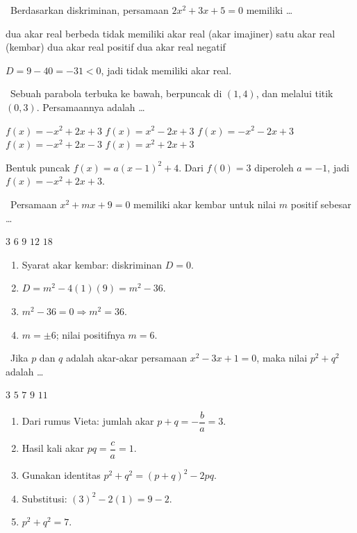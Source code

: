 \documentclass[11pt,a4paper]{exam}
\newenvironment{langkah}{%
  \begin{enumerate}[label=\textbf{Langkah \arabic*:},leftmargin=2.6em,
    itemsep=2pt,topsep=2pt]}{\end{enumerate}}
\newcommand{\Inter}{{\footnotesize\textsf{\textcolor{biru}{[Intermediate]}}}\ }
\newcommand{\Adv}{{\footnotesize\textsf{\textcolor{oranye}{[Advanced]}}}\ }
\newcommand{\Exp}{{\footnotesize\textsf{\textcolor{ungu}{[Expert]}}}\ }
\begin{document}
\begin{questions}
\question \Inter Berdasarkan diskriminan, persamaan $2x^{2} + 3x + 5 = 0$ memiliki \dots
\begin{choices}
\choice dua akar real berbeda
\CorrectChoice tidak memiliki akar real (akar imajiner)
\choice satu akar real (kembar)
\choice dua akar real positif
\choice dua akar real negatif
\end{choices}
\begin{solution}$D = 9 - 40 = -31 < 0$, jadi tidak memiliki akar real.\end{solution}

\question \Inter Sebuah parabola terbuka ke bawah, berpuncak di $(1,4)$, dan melalui
titik $(0,3)$. Persamaannya adalah \dots
\begin{choices}
\CorrectChoice $f(x) = -x^{2} + 2x + 3$
\choice $f(x) = x^{2} - 2x + 3$
\choice $f(x) = -x^{2} - 2x + 3$
\choice $f(x) = -x^{2} + 2x - 3$
\choice $f(x) = x^{2} + 2x + 3$
\end{choices}
\begin{solution}Bentuk puncak $f(x)=a(x-1)^{2}+4$. Dari $f(0)=3$ diperoleh $a=-1$,
jadi $f(x) = -x^{2}+2x+3.$\end{solution}

\question \Adv Persamaan $x^{2} + mx + 9 = 0$ memiliki akar kembar untuk nilai $m$
positif sebesar \dots
\begin{choices}
\choice $3$ \CorrectChoice $6$ \choice $9$ \choice $12$ \choice $18$
\end{choices}
\begin{solution}
\begin{langkah}
\item Syarat akar kembar: diskriminan $D = 0$.
\item $D = m^{2} - 4(1)(9) = m^{2} - 36$.
\item $m^{2} - 36 = 0 \Rightarrow m^{2} = 36$.
\item $m = \pm 6$; nilai positifnya $m = 6$.
\end{langkah}
\end{solution}

\question \Exp Jika $p$ dan $q$ adalah akar-akar persamaan $x^{2} - 3x + 1 = 0$, maka
nilai $p^{2} + q^{2}$ adalah \dots
\begin{choices}
\choice $3$ \choice $5$ \CorrectChoice $7$ \choice $9$ \choice $11$
\end{choices}
\begin{solution}
\begin{langkah}
\item Dari rumus Vieta: jumlah akar $p+q = -\dfrac{b}{a} = 3$.
\item Hasil kali akar $pq = \dfrac{c}{a} = 1$.
\item Gunakan identitas $p^{2}+q^{2} = (p+q)^{2} - 2pq$.
\item Substitusi: $(3)^{2} - 2(1) = 9 - 2$.
\item $p^{2}+q^{2} = 7$.
\end{langkah}
\end{solution}


\end{questions}
\end{document}
